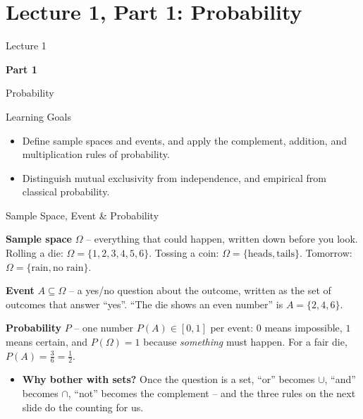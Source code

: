\section{Lecture 1, Part 1: Probability}

\begin{frame}
\vfill
\centering
{\color{RLBlue}\large Lecture 1}

\vspace{0.3em}
{\color{RLBlue}\Large\bfseries Part 1}

\vspace{0.6em}
{\Large Probability}
\vfill
\end{frame}

\begin{frame}{Learning Goals}
\begin{itemize}
  \item Define sample spaces and events, and apply the complement, addition, and multiplication rules of probability.
  \pause
  \item Distinguish mutual exclusivity from independence, and empirical from classical probability.
\end{itemize}
\end{frame}

\begin{frame}{Sample Space, Event \& Probability}
\begin{rldefinition}
\textbf{Sample space} $\Omega$ -- everything that could happen, written down before you look. Rolling a die: $\Omega = \{1,2,3,4,5,6\}$. Tossing a coin: $\Omega = \{\text{heads},\text{tails}\}$. Tomorrow: $\Omega = \{\text{rain},\text{no rain}\}$.

\smallskip
\textbf{Event} $A \subseteq \Omega$ -- a yes/no question about the outcome, written as the set of outcomes that answer ``yes''. ``The die shows an even number'' is $A = \{2,4,6\}$.

\smallskip
\textbf{Probability} $P$ -- one number $P(A) \in [0,1]$ per event: $0$ means impossible, $1$ means certain, and $P(\Omega) = 1$ because \emph{something} must happen. For a fair die, $P(A) = \tfrac{3}{6} = \tfrac12$.
\end{rldefinition}
\pause
\begin{itemize}
  \item \textbf{Why bother with sets?} Once the question is a set, ``or'' becomes $\cup$, ``and'' becomes $\cap$, ``not'' becomes the complement -- and the three rules on the next slide do the counting for us.
\end{itemize}
\end{frame}

